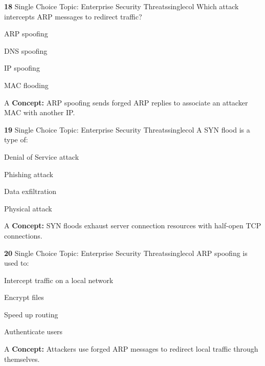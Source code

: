 \documentclass[10pt,a4paper]{article}
\begin{document}
\begin{qcard}{\color{white}\textbf{18} \hfill \small Single Choice \textbar{} Topic: Enterprise Security Threats}{singlecol}
Which attack intercepts ARP messages to redirect traffic?

\begin{qoptions}
\item ARP spoofing
\item DNS spoofing
\item IP spoofing
\item MAC flooding
\end{qoptions}
\begin{explainbox}{A}
\textbf{Concept:} ARP spoofing sends forged ARP replies to associate an attacker MAC with another IP.
\end{explainbox}
\end{qcard}

\begin{qcard}{\color{white}\textbf{19} \hfill \small Single Choice \textbar{} Topic: Enterprise Security Threats}{singlecol}
A SYN flood is a type of:

\begin{qoptions}
\item Denial of Service attack
\item Phishing attack
\item Data exfiltration
\item Physical attack
\end{qoptions}
\begin{explainbox}{A}
\textbf{Concept:} SYN floods exhaust server connection resources with half-open TCP connections.
\end{explainbox}
\end{qcard}

\begin{qcard}{\color{white}\textbf{20} \hfill \small Single Choice \textbar{} Topic: Enterprise Security Threats}{singlecol}
ARP spoofing is used to:

\begin{qoptions}
\item Intercept traffic on a local network
\item Encrypt files
\item Speed up routing
\item Authenticate users
\end{qoptions}
\begin{explainbox}{A}
\textbf{Concept:} Attackers use forged ARP messages to redirect local traffic through themselves.
\end{explainbox}
\end{qcard}
\end{document}
